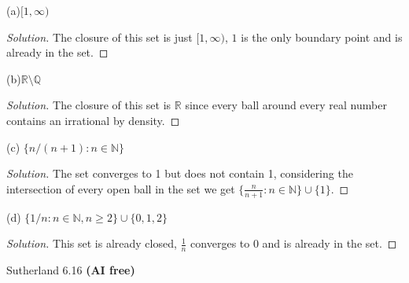 \documentclass[minion]{homework}
\newcommand{\Reals}{\ensuremath{\mathbb R}}%
\newcommand{\Rats}{\ensuremath{\mathbb Q}} %
\newcommand{\Nats}{\ensuremath{\mathbb N}} %
\begin{document}
\begin{problems}
  (a)$[1,\infty)$
  \begin{proof}[Solution]
    The closure of this set is just $[1, \infty)$, $1$ is the only boundary point and is already in the set.
  \end{proof}
  (b)$\Reals \setminus \Rats$
  \begin{proof}[Solution] 
    The closure of this set is $\Reals$ since every ball around every real number contains an irrational by density.\end{proof}
  (c) $\{n/(n+1):n\in\Nats\}$
  \begin{proof}[Solution] The set converges to 1 but does not contain 1, considering the intersection of every open ball in the set we get
    $\{\frac{n}{n+1} : n \in \Nats\} \cup \{1\}.$
  \end{proof}
  (d) $\{1/n : n \in \Nats, n \geq 2\} \cup \{0,1,2\}$
  \begin{proof}[Solution]
    This set is already closed, $\frac{1}{n}$ converges to $0$ and is already in the set.
  \end{proof}

  \problem Sutherland 6.16 \textbf{(AI free)} 


\end{problems}
\end{document}
